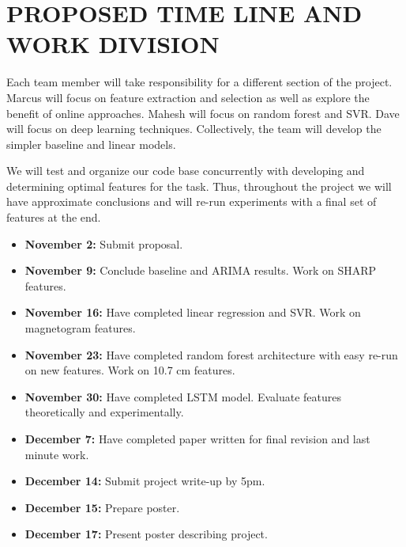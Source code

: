 \documentclass[letterpaper, 10 pt, onecolumn]{ieeeconf}
\begin{document}
\section{PROPOSED TIME LINE AND WORK DIVISION}

Each team member will take responsibility for a different section of the project. Marcus will focus on feature extraction and selection as well as explore the benefit of online approaches. Mahesh will focus on random forest and SVR. Dave will focus on deep learning techniques. Collectively, the team will develop the simpler baseline and linear models. 

We will test and organize our code base concurrently with developing and determining optimal features for the task. Thus, throughout the project we will have approximate conclusions and will re-run experiments with a final set of features at the end.
\begin{itemize}
    \item \textbf{November 2:} Submit proposal.
    \item \textbf{November 9:} Conclude baseline and ARIMA results. Work on SHARP features.
    \item \textbf{November 16:} Have completed linear regression and SVR. Work on magnetogram features. 
    \item \textbf{November 23:} Have completed random forest architecture with easy re-run on new features. Work on 10.7 cm features. 
    \item \textbf{November 30:} Have completed LSTM model. Evaluate features theoretically and experimentally. 
    \item \textbf{December 7:} Have completed paper written for final revision and last minute work.
    \item \textbf{December 14:} Submit project write-up by 5pm.
    \item \textbf{December 15:} Prepare poster.
    \item \textbf{December 17:} Present poster describing project.
\end{itemize}

\newpage 
\end{document}
